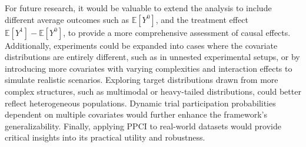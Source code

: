 \documentclass[12pt, oneside]{amsart}
\theoremstyle{definition}
\theoremstyle{remark}
\numberwithin{equation}{section}
\begin{document}
For future research, it would be valuable to extend the analysis to include different average outcomes such as $\mathbb{E}[Y^0]$, and the treatment effect $\mathbb{E}[Y^1] - \mathbb{E}[Y^0]$, to provide a more comprehensive assessment of causal effects. Additionally, experiments could be expanded into cases where the covariate distributions are entirely different, such as in unnested experimental setups, or by introducing more covariates with varying complexities and interaction effects to simulate realistic scenarios. Exploring target distributions drawn from more complex structures, such as multimodal or heavy-tailed distributions, could better reflect heterogeneous populations. Dynamic trial participation probabilities dependent on multiple covariates would further enhance the framework's generalizability. Finally, applying PPCI to real-world datasets would provide critical insights into its practical utility and robustness.
\clearpage
\printbibliography
\end{document}
